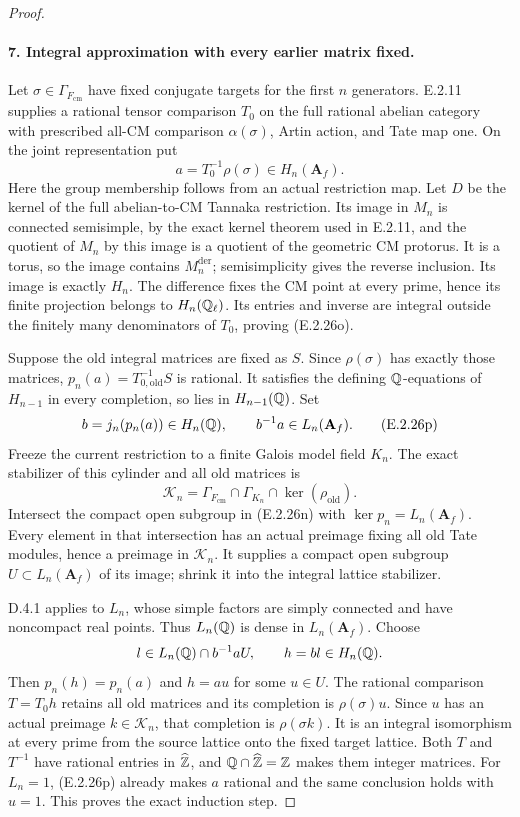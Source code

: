 \begin{proof}
\paragraph{7. Integral approximation with every earlier matrix fixed.}
Let \(\sigma\in\Gamma_{F_{\mathrm{cm}}}\) have
fixed conjugate targets for the first \(n\)
generators. E.2.11 supplies a rational tensor
comparison \(T_0\) on the full rational abelian
category with prescribed all-CM comparison
\(\alpha(\sigma)\), Artin action, and Tate map
one. On the joint representation put
\[
 a=T_0^{-1}\rho(\sigma)\in H_n(\mathbf A_f).
 \tag{E.2.26o}
\]
Here the group membership follows from an actual
restriction map. Let \(D\) be the kernel of
the full abelian-to-CM Tannaka restriction.
Its image in \(M_n\) is connected semisimple,
by the exact kernel theorem used in E.2.11,
and the quotient of \(M_n\) by this image is
a quotient of the geometric CM protorus.
It is a torus, so the image contains
\(M_n^{\mathrm{der}}\); semisimplicity gives
the reverse inclusion. Its image is exactly
\(H_n\). The difference fixes the CM point
at every prime, hence its finite projection
belongs to \(H_n(\mathbb Q_\ell)\). Its entries
and inverse are integral outside the finitely
many denominators of \(T_0\), proving
(E.2.26o).

Suppose the old integral matrices are fixed as
\(S\). Since \(\rho(\sigma)\) has exactly
those matrices, \(p_n(a)=T_{0,\mathrm{old}}^{-1}S\)
is rational. It satisfies the defining
\(\mathbb Q\)-equations of \(H_{n-1}\) in every
completion, so lies in \(H_{n-1}(\mathbb Q)\).
Set
\[
 b=j_n(p_n(a))\in H_n(\mathbb Q),\qquad
 b^{-1}a\in L_n(\mathbf A_f).
 \tag{E.2.26p}
\]
Freeze the current restriction to a finite
Galois model field \(K_n\). The exact
stabilizer of this cylinder and all old
matrices is
\[
 \mathcal K_n=\Gamma_{F_{\mathrm{cm}}}
       \cap\Gamma_{K_n}\cap\ker(\rho_{\mathrm{old}}).
 \tag{E.2.26q}
\]
Intersect the compact open subgroup in
(E.2.26n) with \(\ker p_n=L_n(\mathbf A_f)\).
Every element in that intersection has an
actual preimage fixing all old Tate modules,
hence a preimage in \(\mathcal K_n\).
It supplies a compact open subgroup
\(U\subset L_n(\mathbf A_f)\) of its image;
shrink it into the integral lattice stabilizer.

D.4.1 applies to \(L_n\), whose simple factors
are simply connected and have noncompact real
points. Thus \(L_n(\mathbb Q)\) is dense in
\(L_n(\mathbf A_f)\). Choose
\[
 l\in L_n(\mathbb Q)\cap b^{-1}aU,
 \qquad h=bl\in H_n(\mathbb Q).
\]
Then \(p_n(h)=p_n(a)\) and \(h=au\)
for some \(u\in U\). The rational comparison
\(T=T_0h\) retains all old matrices and
its completion is \(\rho(\sigma)u\).
Since \(u\) has an actual preimage
\(k\in\mathcal K_n\), that completion
is \(\rho(\sigma k)\). It is an integral
isomorphism at every prime from the source
lattice onto the fixed target lattice.
Both \(T\) and \(T^{-1}\) have rational
entries in \(\widehat{\mathbb Z}\), and
\(\mathbb Q\cap\widehat{\mathbb Z}=\mathbb Z\) makes them
integer matrices. For \(L_n=1\),
(E.2.26p) already makes \(a\) rational
and the same conclusion holds with \(u=1\).
This proves the exact induction step.


\end{proof}
